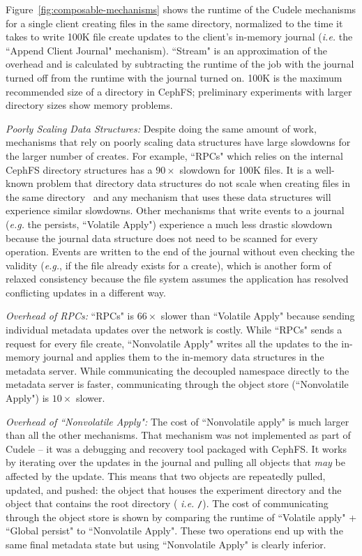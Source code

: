 Figure~\ref{fig:composable-mechanisms} shows the runtime of the Cudele
mechanisms for a single client creating files in the same directory, normalized
to the time it takes to write 100K file create updates to the client's
in-memory journal ({\it i.e.} the ``Append Client Journal" mechanism).
``Stream" is an approximation of the overhead and is calculated by subtracting
the runtime of the job with the journal turned off from the runtime with the
journal turned on.  100K is the maximum recommended size of a directory in
CephFS; preliminary experiments with larger directory sizes show memory
problems.

{\it Poorly Scaling Data Structures:} Despite doing the same amount of work,
mechanisms that rely on poorly scaling data structures have large slowdowns for
the larger number of creates. For example, ``RPCs" which relies on the internal
CephFS directory structures has a \(90\times\) slowdown for 100K files. It is a
well-known problem that directory data structures do not scale when creating
files in the same directory~\cite{ren:sc2014-indexfs} and any mechanism that
uses these data structures will experience similar slowdowns. Other mechanisms
that write events to a journal ({\it e.g.} the persists, ``Volatile Apply")
experience a much less drastic slowdown because the journal data structure does
not need to be scanned for every operation. Events are written to the end of
the journal without even checking the validity ({\it e.g.}, if the file already
exists for a create), which is another form of relaxed consistency because the
file system assumes the application has resolved conflicting updates in a
different way.

{\it Overhead of RPCs:} ``RPCs" is \(66\times\) slower than ``Volatile
Apply" because sending individual metadata updates over the network is costly.
While ``RPCs" sends a request for every file create, ``Nonvolatile Apply"
writes all the updates to the in-memory journal and applies them to the
in-memory data structures in the metadata server. While communicating the
decoupled namespace directly to the metadata server is faster, communicating
through the object store (``Nonvolatile Apply") is \(10\times\) slower.

{\it Overhead of ``Nonvolatile Apply":} The cost of ``Nonvolatile
apply" is much larger than all the other mechanisms.  That mechanism was not
implemented as part of Cudele -- it was a debugging and recovery tool packaged
with CephFS. It works by iterating over the updates in the journal and pulling
all objects that {\it may} be affected by the update.  This means that two
objects are repeatedly pulled, updated, and pushed: the object that houses the
experiment directory and the object that contains the root directory ({\it
i.e.} \texttt{/}).  The cost of communicating through the object store is shown
by comparing the runtime of ``Volatile apply" + ``Global persist" to
``Nonvolatile Apply". These two operations end up with the same final metadata
state but using ``Nonvolatile Apply" is clearly inferior.

